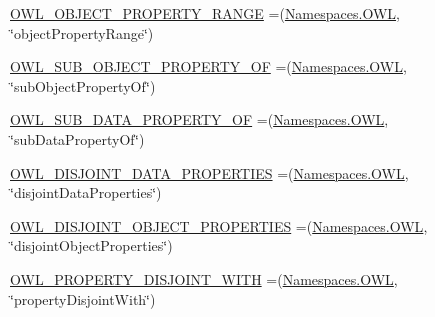\begin{DoxyCompactItemize}
\item 
\hyperlink{enumorg_1_1semanticweb_1_1owlapi_1_1vocab_1_1_o_w_l_r_d_f_vocabulary_a6331fa87d4af94a2f9ce7996fea699ee}{O\-W\-L\-\_\-\-O\-B\-J\-E\-C\-T\-\_\-\-P\-R\-O\-P\-E\-R\-T\-Y\-\_\-\-R\-A\-N\-G\-E} =(\hyperlink{enumorg_1_1semanticweb_1_1owlapi_1_1vocab_1_1_namespaces_a2fcb537074d9307ef1356ffb6a5bd6f4}{Namespaces.\-O\-W\-L}, \char`\"{}object\-Property\-Range\char`\"{})
\item 
\hyperlink{enumorg_1_1semanticweb_1_1owlapi_1_1vocab_1_1_o_w_l_r_d_f_vocabulary_a08be7b44f6eb3baf924082fc148c2d6f}{O\-W\-L\-\_\-\-S\-U\-B\-\_\-\-O\-B\-J\-E\-C\-T\-\_\-\-P\-R\-O\-P\-E\-R\-T\-Y\-\_\-\-O\-F} =(\hyperlink{enumorg_1_1semanticweb_1_1owlapi_1_1vocab_1_1_namespaces_a2fcb537074d9307ef1356ffb6a5bd6f4}{Namespaces.\-O\-W\-L}, \char`\"{}sub\-Object\-Property\-Of\char`\"{})
\item 
\hyperlink{enumorg_1_1semanticweb_1_1owlapi_1_1vocab_1_1_o_w_l_r_d_f_vocabulary_afa1bb5a4c28d0151d98788ee6a9a5041}{O\-W\-L\-\_\-\-S\-U\-B\-\_\-\-D\-A\-T\-A\-\_\-\-P\-R\-O\-P\-E\-R\-T\-Y\-\_\-\-O\-F} =(\hyperlink{enumorg_1_1semanticweb_1_1owlapi_1_1vocab_1_1_namespaces_a2fcb537074d9307ef1356ffb6a5bd6f4}{Namespaces.\-O\-W\-L}, \char`\"{}sub\-Data\-Property\-Of\char`\"{})
\item 
\hyperlink{enumorg_1_1semanticweb_1_1owlapi_1_1vocab_1_1_o_w_l_r_d_f_vocabulary_a975cd109feded0064c7ba0889896c048}{O\-W\-L\-\_\-\-D\-I\-S\-J\-O\-I\-N\-T\-\_\-\-D\-A\-T\-A\-\_\-\-P\-R\-O\-P\-E\-R\-T\-I\-E\-S} =(\hyperlink{enumorg_1_1semanticweb_1_1owlapi_1_1vocab_1_1_namespaces_a2fcb537074d9307ef1356ffb6a5bd6f4}{Namespaces.\-O\-W\-L}, \char`\"{}disjoint\-Data\-Properties\char`\"{})
\item 
\hyperlink{enumorg_1_1semanticweb_1_1owlapi_1_1vocab_1_1_o_w_l_r_d_f_vocabulary_abcc94f30b5c2f254d5a0a93964d5404f}{O\-W\-L\-\_\-\-D\-I\-S\-J\-O\-I\-N\-T\-\_\-\-O\-B\-J\-E\-C\-T\-\_\-\-P\-R\-O\-P\-E\-R\-T\-I\-E\-S} =(\hyperlink{enumorg_1_1semanticweb_1_1owlapi_1_1vocab_1_1_namespaces_a2fcb537074d9307ef1356ffb6a5bd6f4}{Namespaces.\-O\-W\-L}, \char`\"{}disjoint\-Object\-Properties\char`\"{})
\item 
\hyperlink{enumorg_1_1semanticweb_1_1owlapi_1_1vocab_1_1_o_w_l_r_d_f_vocabulary_a5fbbe9fd56e4f0db1e6c212b96279585}{O\-W\-L\-\_\-\-P\-R\-O\-P\-E\-R\-T\-Y\-\_\-\-D\-I\-S\-J\-O\-I\-N\-T\-\_\-\-W\-I\-T\-H} =(\hyperlink{enumorg_1_1semanticweb_1_1owlapi_1_1vocab_1_1_namespaces_a2fcb537074d9307ef1356ffb6a5bd6f4}{Namespaces.\-O\-W\-L}, \char`\"{}property\-Disjoint\-With\char`\"{})
\item 

\end{DoxyCompactItemize}
